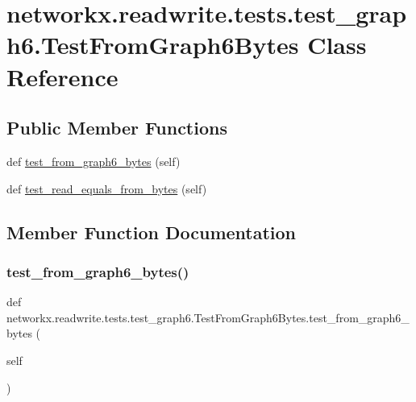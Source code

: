 \hypertarget{classnetworkx_1_1readwrite_1_1tests_1_1test__graph6_1_1TestFromGraph6Bytes}{}\section{networkx.\+readwrite.\+tests.\+test\+\_\+graph6.\+Test\+From\+Graph6\+Bytes Class Reference}
\label{classnetworkx_1_1readwrite_1_1tests_1_1test__graph6_1_1TestFromGraph6Bytes}
\subsection*{Public Member Functions}
\begin{DoxyCompactItemize}
\item 
def \hyperlink{classnetworkx_1_1readwrite_1_1tests_1_1test__graph6_1_1TestFromGraph6Bytes_a2e5d3e48093a93cf986c386c95f389c4}{test\+\_\+from\+\_\+graph6\+\_\+bytes} (self)
\item 
def \hyperlink{classnetworkx_1_1readwrite_1_1tests_1_1test__graph6_1_1TestFromGraph6Bytes_a10eb6b6e15b4e9873948f0df1dddf373}{test\+\_\+read\+\_\+equals\+\_\+from\+\_\+bytes} (self)
\end{DoxyCompactItemize}


\subsection{Member Function Documentation}
\mbox{\label{classnetworkx_1_1readwrite_1_1tests_1_1test__graph6_1_1TestFromGraph6Bytes_a2e5d3e48093a93cf986c386c95f389c4}} 
\subsubsection{\texorpdfstring{test\+\_\+from\+\_\+graph6\+\_\+bytes()}{test\_from\_graph6\_bytes()}}
{\footnotesize\ttfamily def networkx.\+readwrite.\+tests.\+test\+\_\+graph6.\+Test\+From\+Graph6\+Bytes.\+test\+\_\+from\+\_\+graph6\+\_\+bytes (\begin{DoxyParamCaption}\item[{}]{self }\end{DoxyParamCaption})}

